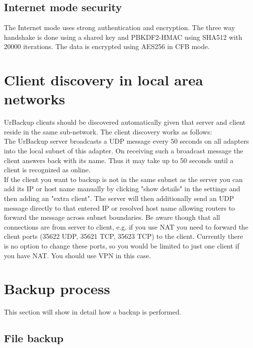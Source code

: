 \documentclass[a4paper,10pt]{article}
\begin{document}
\subsection{Internet mode security}

The Internet mode uses strong authentication and encryption. The three way
handshake is done using a shared key and PBKDF2-HMAC using SHA512 with 20000
iterations. The data is encrypted using AES256 in CFB mode.


\section{Client discovery in local area networks}
\label{client_discovery}

UrBackup clients should be discovered automatically given that server and client reside in the same sub-network. The client discovery works as follows:\\
The UrBackup server broadcasts a UDP message every 50 seconds on all adapters into the local subnet of this adapter. On receiving such a broadcast message the client answers back with its name. Thus it may take up to 50 seconds until a client is recognized as online.\\
If the client you want to backup is not in the same subnet as the server you can add its IP or host name manually by clicking "show details" in the settings and then adding an "extra client". The server will then additionally send an UDP message directly to that entered IP or resolved host name allowing routers to forward the message across subnet boundaries. Be aware though that all connections are from server to client, e.g. if you use NAT you need to forward the client ports (35622 UDP, 35621 TCP, 35623 TCP) to the client. Currently there is no option to change these ports, so you would be limited to just one client if you have NAT. You should use VPN in this case.

\section{Backup process}
\label{sec_backup_process}

This section will show in detail how a backup is performed.

\subsection{File backup}
\end{document}
